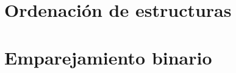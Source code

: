 \documentclass[a4paper,12pt,twoside]{book}
\begin{document}
\chapter{Ordenación de estructuras}

\chapter{Emparejamiento binario}


\end{document}
